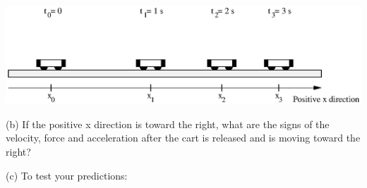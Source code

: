 \vspace{0.3cm}
{\par\centering \includegraphics{force2_fig3.eps} \par}
\vspace{0.3cm}

(b) If the positive x direction is toward the right, what are the signs of the
velocity, force and acceleration after the cart is released and is moving toward
the right?
\vspace{10mm}

(c) To test your predictions: 

